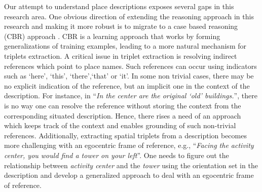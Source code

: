 \documentclass{sig-alternate}
\begin{document}
Our attempt to understand place descriptions exposes several gaps in this research area. One obvious direction of extending the reasoning approach in this research and making it more robust is to migrate to a case based reasoning (CBR) approach \cite{xu:case}. CBR is a learning approach that works by forming generalizations of training examples, leading to a more natural mechanism for triplets extraction. 
A critical issue in triplet extraction is resolving indirect references which point to place names.
Such references can occur using indicators such as `here', `this', `there',`that' or `it'. 
In some non trivial cases, there may be no explicit indication of the reference, but an implicit one in the context of the description. For instance, in ``\textit{In the center are the original `old' buildings.}'', there is no way one can resolve the reference without storing the context from the corresponding situated description. 
Hence, there rises a need of an approach which keeps track of the context and enables grounding of such non-trivial references. 
Additionally, extracting spatial triplets from a description becomes more challenging with an egocentric frame of reference, e.g., ``\textit{Facing the activity center, you would find a tower on your left}''. One needs to figure out the relationship between \textit{activity center} and the \textit{tower} using the orientation set in the description and develop a generalized approach to deal with an egocentric frame of reference.


%
%
\end{document}
